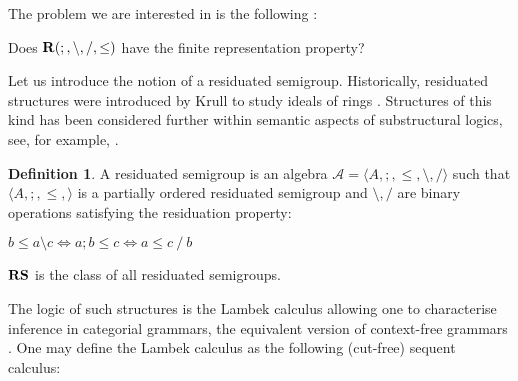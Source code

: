 \documentclass[a4paper]{article}
\theoremstyle{definition}
\newtheorem{definition}{Definition}
\theoremstyle{theorem}
\theoremstyle{proposition}
\theoremstyle{lemma}
\theoremstyle{ex}
\theoremstyle{corollary}
\theoremstyle{claim}
\begin{document}
The problem we are interested in is the following \cite[Problem 19.17]{hirsch2002relation}:

\begin{center}
  Does ${\bf R}(;, \setminus, /, \leq)$ have the finite representation property?
\end{center}

Let us introduce the notion of a residuated semigroup. Historically, residuated structures were introduced by Krull to study ideals of rings \cite{krull1968idealtheorie}. Structures of this kind has been considered further within semantic aspects of substructural logics, see, for example, \cite{jipsen2002survey}.

\begin{definition}
  A residuated semigroup is an algebra $\mathcal{A} = \langle A, ;, \leq, \setminus, / \rangle$ such that $\langle A, ;, \leq, \rangle$ is a partially ordered residuated semigroup and $\setminus, /$ are binary operations satisfying the residuation property:

  \begin{center}
    $b \leq a \setminus c \Leftrightarrow a ; b \leq c \Leftrightarrow a \leq c \: / \: b$
  \end{center}
  ${\bf RS}$ is the class of all residuated semigroups.
\end{definition}

The logic of such structures is the Lambek calculus \cite{lambek1958mathematics} allowing one to characterise inference in categorial grammars, the equivalent version of context-free grammars \cite{pentus1993lambek}. One may define the Lambek calculus as the following (cut-free) sequent calculus:
\end{document}
